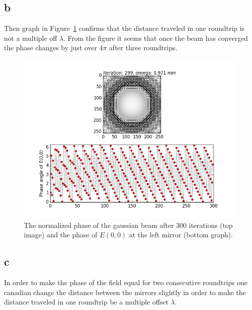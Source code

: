 \documentclass[12pt,a4paper]{article}
\begin{document}
\subsection{b}
Then graph in Figure~\ref{fig:task7b} confirms that the distance traveled in one roundtrip is not a multiple off $\lambda$. From the figure it seems that once the beam has converged the phase changes by just over $4\pi$ after three roundtrips.
\begin{figure}
  \centering
  \includegraphics[width=\textwidth]{7b_gauss_0_0.png}
  \caption{The normalized phase of the gaussian beam after 300 iterations (top image) and the phase of $E(0,0)$ at the left mirror (bottom graph).}
  \label{fig:task7b}
\end{figure}

\subsection{c}
In order to make the phase of the field equal for two consecutive roundtrips one canadian change the distance between the mirrors slightly in order to make the distance traveled in one roundtrip be a multiple offset $\lambda$.
\end{document}
